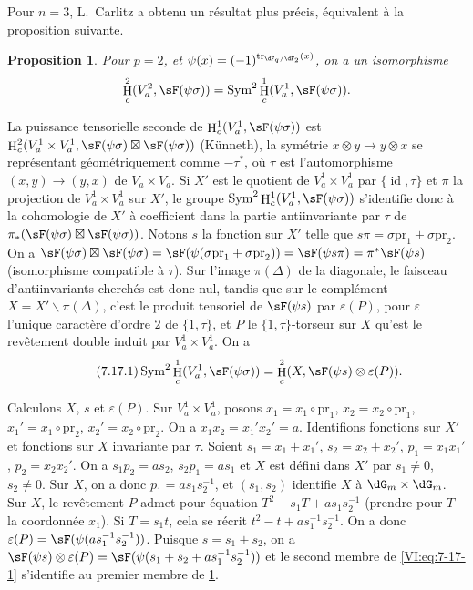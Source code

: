 \documentclass[oneside]{book}
\DeclareMathOperator{\h}{H}
\DeclareMathOperator{\tr}{tr}
\renewcommand{\setminus}{\smallsetminus}
\newcommand{\pr}{\mathrm{pr}} %
\theoremstyle{sga-source}
\theoremstyle{sga-source-dash}
\theoremstyle{sga-source-dotdash}
\theoremstyle{sga-source-number-note-dash}
\theoremstyle{sga-source-note-number-dotdash}
\theoremstyle{sga-source-example-dotdash}
\theoremstyle{sga-source-inline-number}
\theoremstyle{sga-source-bare-number}
\theoremstyle{sga-source}
\newtheorem{proposition_}[subsection]{Proposition}
\newcommand{\PrintPage}[1]{}\newcommand{\MathPage}[1]{}\newcommand{\PrintCite}[2]{#1}\newcommand{\var}[3]{#1}
\begin{document}
Pour $n=3$, L.\ Carlitz \cite{ca69-2} a obtenu un résultat plus précis, 
équivalent à la proposition suivante. 





\begin{proposition_}\label{VI:7-17}
Pour $p=2$, et $\psi(x)=(-1)^{\tr_{\dF_q/\dF_2}(x)}$, on a un isomorphisme 
\[
  \h_c^2(V_a^2,\sF(\psi\sigma)) = \operatorname{Sym}^2 \h_c^1(V_a^1,\sF(\psi\sigma)) \text{.} 
\]
\end{proposition_}

\PrintPage{227}
La puissance tensorielle seconde de $\h_c^1(V_a^1,\sF(\psi\sigma))$ est 
$\h_c^2(V_a^1\times V_a^1,\sF(\psi\sigma)\boxtimes \sF(\psi\sigma))$ 
(K\"unneth), la symétrie $x\otimes y\to y\otimes x$ se représentant 
géométriquement comme $-\tau^\ast$, où $\tau$ est l'automorphisme 
$(x,y)\to (y,x)$ de $V_a\times V_a$. Si $X'$ est le quotient de 
$V_a^1\times V_a^1$ par $\{\operatorname{id}{},\tau\}$ et $\pi$ la 
projection de $V_a^1\times V_a^1$ sur $X'$, le groupe 
$\operatorname{Sym}^2 \h_c^1(V_a^1,\sF(\psi\sigma))$ s'identifie donc à la 
cohomologie de $X'$ à coefficient dans la partie antiinvariante par $\tau$ de 
$\pi_\ast(\sF(\psi\sigma)\boxtimes \sF(\psi\sigma))$. Notons $s$ la fonction 
sur $X'$ telle que $s\pi =\sigma\pr_1+\sigma\pr_2$. On a 
$\sF(\psi\sigma)\boxtimes \sF(\psi\sigma) = \sF(\psi(\sigma\pr_1+\sigma\pr_2)) = \sF(\psi s \pi) = \pi^\ast \sF(\psi s)$ 
(isomorphisme compatible à $\tau$). Sur l'image $\pi(\Delta)$ de la 
diagonale, le faisceau d'antiinvariants cherchés est donc nul, tandis que sur 
le complément $X=X'\setminus \pi(\Delta)$, c'est le produit tensoriel de 
$\sF(\psi s)$ par $\varepsilon(P)$, pour $\varepsilon$ l'unique caractère 
d'ordre $2$ de $\{1,\tau\}$, et $P$ le $\{1,\tau\}$-torseur sur $X$ qu'est le 
revêtement double induit par $V_a^1\times V_a^1$. On a 
\begin{equation*}\tag{7.17.1}\label{VI:eq:7-17-1}
  \operatorname{Sym}^2 \h_c^1(V_a^1,\sF(\psi\sigma)) = \h_c^2(X,\sF(\psi s)\otimes \varepsilon(P)) \text{.}
\end{equation*}

Calculons $X$, $s$ et $\varepsilon(P)$. Sur $V_a^1\times V_a^1$, posons 
$x_1=x_1\circ\pr_1$, $x_2=x_2\circ\pr_1$, $x_1'=x_1\circ \pr_2$, 
$x_2'=x_2\circ \pr_2$. On a $x_1 x_2=x_1'x_2'=a$. Identifions fonctions sur 
$X'$ et \var{fonctions sur $X$ invariante par $\tau$}{fonctions sur $V_a^1\times V_a^1$ invariantes par $\tau$}{S45-SOL-0959}. Soient $s_1=x_1+x_1'$, 
$s_2=x_2+x_2'$, $p_1=x_1 x_1'$, $p_2=x_2 x_2'$. On a $s_1 p_2 = a s_2$, 
$s_2 p_1 = a s_1$ et $X$ est défini dans $X'$ par $s_1\ne 0$, $s_2\ne 0$. Sur 
$X$, on a donc $p_1 = a s_1 s_2^{-1}$, et $(s_1,s_2)$ identifie $X$ à 
$\dG_m\times \dG_m$. Sur $X$, le revêtement $P$ admet pour équation 
$T^2-s_1 T+a s_1 s_2^{-1}$ (prendre pour $T$ la coordonnée $x_1$). Si 
$T=s_1 t$, cela se récrit $t^2-t+a s_1^{-1} s_2^{-1}$. On a donc 
$\varepsilon(P) = \sF(\psi(a s_1^{-1} s_2^{-1}))$. Puisque $s=s_1+s_2$, on a 
$\sF(\psi s)\otimes \varepsilon(P) = \sF(\psi(s_1+s_2+ a s_1^{-1} s_2^{-1}))$ 
et le second membre de \eqref{VI:eq:7-17-1} s'identifie au premier membre de 
\ref{VI:7-17}. 
\end{document}

